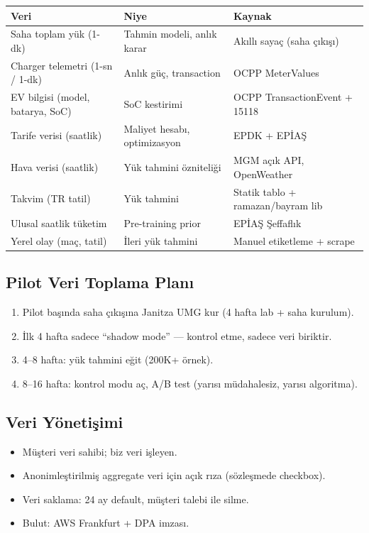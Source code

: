 \documentclass[11pt,a4paper]{article}
\begin{document}
\begin{tabularx}{\textwidth}{l X l}
\toprule
\textbf{Veri} & \textbf{Niye} & \textbf{Kaynak} \\
\midrule
Saha toplam yük (1-dk) & Tahmin modeli, anlık karar & Akıllı sayaç (saha çıkışı) \\
Charger telemetri (1-sn / 1-dk) & Anlık güç, transaction & OCPP MeterValues \\
EV bilgisi (model, batarya, SoC) & SoC kestirimi & OCPP TransactionEvent + 15118 \\
Tarife verisi (saatlik) & Maliyet hesabı, optimizasyon & EPDK + EPİAŞ \\
Hava verisi (saatlik) & Yük tahmini özniteliği & MGM açık API, OpenWeather \\
Takvim (TR tatil) & Yük tahmini & Statik tablo + ramazan/bayram lib \\
Ulusal saatlik tüketim & Pre-training prior & EPİAŞ Şeffaflık \\
Yerel olay (maç, tatil) & İleri yük tahmini & Manuel etiketleme + scrape \\
\bottomrule
\end{tabularx}

\subsection{Pilot Veri Toplama Planı}

\begin{enumerate}
    \item Pilot başında saha çıkışına Janitza UMG kur (4 hafta lab + saha kurulum).
    \item İlk 4 hafta sadece ``shadow mode'' --- kontrol etme, sadece veri biriktir.
    \item 4--8 hafta: yük tahmini eğit (200K+ örnek).
    \item 8--16 hafta: kontrol modu aç, A/B test (yarısı müdahalesiz, yarısı algoritma).
\end{enumerate}

\subsection{Veri Yönetişimi}

\begin{itemize}
    \item Müşteri veri sahibi; biz veri işleyen.
    \item Anonimleştirilmiş aggregate veri için açık rıza (sözleşmede checkbox).
    \item Veri saklama: 24 ay default, müşteri talebi ile silme.
    \item Bulut: AWS Frankfurt + DPA imzası.
\end{itemize}
\end{document}
